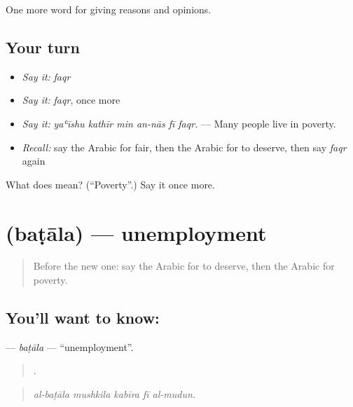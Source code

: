 \begin{grammarlens}[title={What you've built}]
One more word for giving reasons and opinions.
\end{grammarlens}

\subsection*{Your turn}
\begin{itemize}
\raggedright
  \item \emph{Say it:} \emph{faqr}
  \item \emph{Say it:} \emph{faqr}, once more
  \item \emph{Say it:} \emph{yaʿīshu kathīr min an-nās fī faqr.} — Many people live in poverty.
  \item \emph{Recall:} say the Arabic for fair, then the Arabic for to deserve, then say \emph{faqr} again
\end{itemize}

\begin{tcolorbox}[breakable,colback=teal!4,colframe=teal!35!black,title={Before you move on}]
What does  mean? (\textquotedblleft{}Poverty\textquotedblright{}.) Say it once more.
\end{tcolorbox}
\section[\texorpdfstring{\ar{بطالة} (baṭāla)}{بطالة (baṭāla)}]{ (baṭāla) — unemployment}

\label{lesson:AR-C381-batala}



\begin{quote}
Before the new one: say the Arabic for to deserve, then the Arabic for poverty.
\end{quote}

\subsection*{You'll want to know: }
\textbf{} — \emph{baṭāla} — \textquotedblleft{}unemployment\textquotedblright{}.

\begin{quote}
    .
\end{quote}

\begin{quote}
\emph{al-baṭāla mushkila kabīra fī al-mudun.}
\end{quote}

